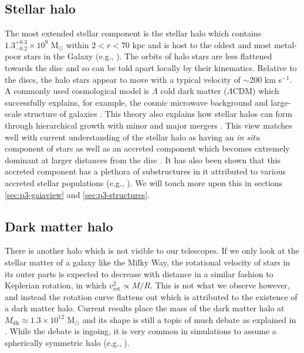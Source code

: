 \subsection{Stellar halo}\label{subsec:components-stellarhalo}
The most extended stellar component is the stellar halo which contains $1.3^{+0.3}_{-0.2} \times 10^9$ M$_\odot$ within $2 < r < 70$ kpc \citep{mackereth:20} and is host to the oldest and most metal-poor stars in the Galaxy (e.g., \citealt{dacosta:19, horta:22}). The orbits of halo stars are less flattened towards the disc and so can be told apart locally by their kinematics. Relative to the discs, the halo stars appear to move with a typical velocity of ${\sim}$200 km s$^{-1}$. A commonly used cosmological model is $\Lambda$ cold dark matter ($\Lambda$CDM) which successfully explains, for example, the cosmic microwave background \citep{planck:20} and large-scale structure of galaxies \citep{springel:05}. This theory also explains how stellar halos can form through hierarchical growth with minor and major mergers \citep{white:78, fall:80}. This view matches well with current understanding of the stellar halo as having an \textit{in situ} component of stars as well as an accreted component which becomes extremely dominant at larger distances from the disc \citep{naidu:20}. It has also been shown that this accreted component has a plethora of substructures in it attributed to various accreted stellar populations (e.g., \citealt{koppelman:19, feuillet:21, dodd:22}). We will touch more upon this in sections \ref{sec:p3-gaiaview} and \ref{sec:p3-structures}.

\subsection{Dark matter halo}\label{subsec:components-darkhalo}
There is another halo which is not visible to our telescopes. If we only look at the stellar matter of a galaxy like the Milky Way, the rotational velocity of stars in its outer parts is expected to decrease with distance in a similar fashion to Keplerian rotation, in which $v_\mathrm{rot}^2 \propto M/R$. This is not what we observe however, and instead the rotation curve flattens out which is attributed to the existence of a dark matter halo. Current results place the mass of the dark matter halo at $M_\mathrm{dh} \approx 1.3 \times 10^{12}$ M$_\odot$ \citep{posti:19} and its shape is still a topic of much debate as explained in \cite{mcmillan:17}. While the debate is ingoing, it is very common in simulations to assume a spherically symmetric halo (e.g., \citealt{andersson:20}).

